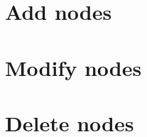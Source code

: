 \documentclass[a4paper, 11pt]{report}
\newcommand{\emptypage}{}
\begin{document}
\section{Add nodes}

\section{Modify nodes}

\section{Delete nodes}

\pagebreak
\glsaddall
\printglossaries

\emptypage
\pagebreak
\listoffigures

\pagebreak
\listoftables

\emptypage
\pagebreak
\lstlistoflistings

%

%
\end{document}
